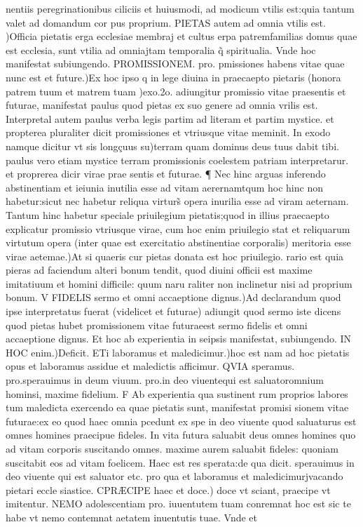 \documentclass{article}
\begin{document}
\begin{pages}
nentiis peregrinationibus ciliciis et huiusmodi, ad modicum vtilis est:quia tantum valet ad domandum cor pus proprium. PIETAS autem ad omnia vtilis est. )Officia pietatis erga ecclesiae membraj et cultus erpa patremfamilias domus quae est ecclesia, sunt vtilia ad omniajtam temporalia q̃ spiritualia. Vnde hoc manifestat subiungendo. PROMISSIONEM. pro. pmissiones habens vitae quae nunc est et future.)Ex hoc ipso q in lege diuina in praecaepto pietaris (honora patrem tuum et matrem tuam )exo.2o. adiungitur promissio vitae praesentis et futurae, manifestat paulus quod pietas ex suo genere ad omnia vrilis est. Interpretal autem paulus verba legis partim ad literam et partim mystice. et propterea pluraliter dicit promissiones et vtriusque vitae meminit. In exodo namque dicitur vt sis longçuus su)terram quam dominus deus tuus dabit tibi. paulus vero etiam mystice terram promissionis coelestem patriam interpretarur. et proprerea dicir virae prae sentis et futurae. ¶ Nec hinc arguas inferendo abstinentiam et ieiunia inutilia esse ad vitam aerernamtqum hoc hinc non habetur:sicut nec habetur reliqua virturs̃ opera inurilia esse ad viram aeternam. Tantum hinc habetur speciale priuilegium pietatis;quod in illius praecaepto explicatur promissio vtriusque virae, cum hoc enim priuilegio stat et reliquarum virtutum opera (inter quae est exercitatio abstinentiae corporalis) meritoria esse virae aetemae.)At si quaeris cur pietas donata est hoc priuilegio. rario est quia pieras ad faciendum alteri bonum tendit, quod diuini officii est maxime imitatiuum et homini difficile: quum naru raliter non inclinetur nisi ad proprium bonum. V FIDELIS sermo et omni accaeptione dignus.)Ad declarandum quod ipse interpretatus fuerat (videlicet et futurae) adiungit quod sermo iste dicens quod pietas hubet promissionem vitae futuraeest sermo fidelis et omni accaeptione dignus. Et hoc ab experientia in seipsis manifestat, subiungendo. IN HOC enim.)Deficit. ETi laboramus et maledicimur.)hoc est nam ad hoc pietatis opus et laboramus assidue et maledictis afficimur. QVIA speramus. pro.sperauimus in deum viuum. pro.in deo viuentequi est saluatoromnium hominsi, maxime fidelium. F Ab experientia qua sustinent rum proprios labores tum maledicta exercendo ea quae pietatis sunt, manifestat promisi sionem vitae futurae:ex eo quod haec omnia pcedunt ex spe in deo viuente quod saluaturus est omnes homines praecipue fideles. In vita futura saluabit deus omnes homines quo ad vitam corporis suscitando omnes. maxime aurem saluabit fideles: quoniam suscitabit eos ad vitam foelicem. Haec est res sperata:de qua dicit. sperauimus in deo viuente qui est saluator etc. pro qua et laboramus et maledicimurjvacando pietari eccle siastice. CPRÆCIPE haec et doce.) doce vt sciant, praecipe vt imitentur. NEMO adolescentiam pro. iuuentutem tuam conremnat hoc est sic te habe vt nemo contemnat aetatem inuentutis tuae. Vnde et  \pend

\end{pages}
\end{document}
